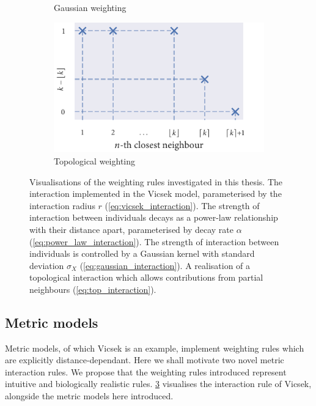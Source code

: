 \begin{figure}[tb]
\begin{subfigure}[b]{0.5\textwidth}
        \caption{Gaussian weighting}
        \label{fig:gauss_weight}
    \end{subfigure}%
    \begin{subfigure}[b]{0.5\textwidth}
        \includegraphics{topological_weighting.pdf}
        \caption{Topological weighting}
        \label{fig:top_weight}
    \end{subfigure}
    \caption{Visualisations of the weighting rules investigated in this thesis.
       The interaction implemented in the Vicsek
      model, parameterised by the interaction radius $r$
      (\cref{eq:vicsek_interaction}).  The strength
      of interaction between individuals decays as a power-law relationship
      with their distance apart, parameterised by decay rate $\alpha$
      (\cref{eq:power_law_interaction}).  The
      strength of interaction between individuals is controlled by a Gaussian
      kernel with standard deviation $\sigma_X$
      (\cref{eq:gaussian_interaction}).  A realisation of
      a topological interaction which allows contributions from partial neighbours
      (\cref{eq:top_interaction}). }
    \label{fig:weighting_rules}
\end{figure}

\subsection{Metric models}

Metric models, of which Vicsek is an example, implement weighting rules which
are explicitly distance-dependant. Here we shall motivate two novel metric
interaction rules. We propose that the weighting rules introduced represent
intuitive and biologically realistic rules. \cref{fig:weighting_rules}
visualises the interaction rule of Vicsek, alongside the metric models here
introduced.

